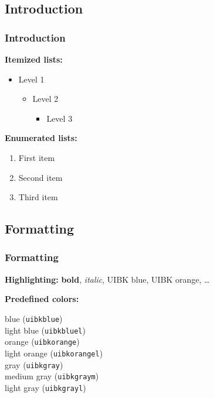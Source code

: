 \documentclass[11pt,t,usepdftitle=false,aspectratio=169]{beamer}
\begin{document}
\subsection{Introduction}


\begin{frame}
\frametitle{Introduction}

   
   \textbf{Itemized lists:}
   \begin{itemize}
      \item Level 1
      \begin{itemize}
         \item Level 2
         \begin{itemize}
            \item Level 3
         \end{itemize}
      \end{itemize}
   \end{itemize}

\bigskip

   \textbf{Enumerated lists:}
   \begin{enumerate}
      \item First item
      \item Second item
      \item Third item
   \end{enumerate}

\end{frame}


\subsection{Formatting}

\begin{frame}[fragile]
\frametitle{Formatting}

   \textbf{Highlighting:} \textbf{bold}, \textit{italic}, {\color{uibkblue} UIBK blue}, {\color{uibkorange} UIBK orange}, \dots

   \bigskip
   
   \textbf{Predefined colors:}
   
   \smallskip
   
    \quad blue (\verb|uibkblue|) \\[1mm]
    \quad light blue (\verb|uibkbluel|) \\[1mm]
    \quad orange (\verb|uibkorange|) \\[1mm]
    \quad light orange (\verb|uibkorangel|) \\[1mm]
    \quad gray (\verb|uibkgray|) \\[1mm]
    \quad medium gray (\verb|uibkgraym|) \\[1mm]
    \quad light gray (\verb|uibkgrayl|)

\end{frame}
\end{document}
